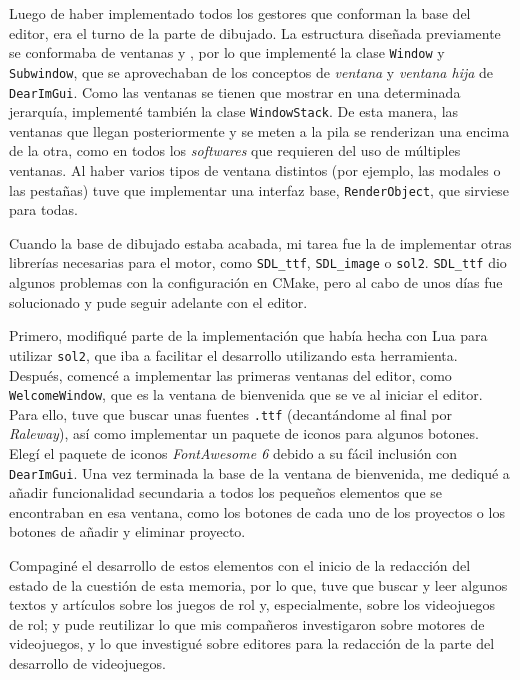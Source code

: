 \medskip

Luego de haber implementado todos los gestores que conforman la base del editor, era el turno de la parte de dibujado. La estructura diseñada previamente se conformaba de ventanas y , por lo que implementé la clase \texttt{Window} y \texttt{Subwindow}, que se aprovechaban de los conceptos de \textit{ventana} y \textit{ventana hija} de \texttt{DearImGui}. Como las ventanas se tienen que mostrar en una determinada jerarquía, implementé también la clase \texttt{WindowStack}. De esta manera, las ventanas que llegan posteriormente y se meten a la pila se renderizan una encima de la otra, como en todos los \textit{softwares} que requieren del uso de múltiples ventanas. Al haber varios tipos de ventana distintos (por ejemplo, las modales o las pestañas) tuve que implementar una interfaz base, \texttt{RenderObject}, que sirviese para todas.

\medskip

Cuando la base de dibujado estaba acabada, mi tarea fue la de implementar otras librerías necesarias para el motor, como \texttt{SDL\_ttf}, \texttt{SDL\_image} o \texttt{sol2}. \texttt{SDL\_ttf} dio algunos problemas con la configuración en CMake, pero al cabo de unos días fue solucionado y pude seguir adelante con el editor.

\smallskip

Primero, modifiqué parte de la implementación que había hecha con Lua para utilizar \texttt{sol2}, que iba a facilitar el desarrollo utilizando esta herramienta. Después, comencé a implementar las primeras ventanas del editor, como \texttt{WelcomeWindow}, que es la ventana de bienvenida que se ve al iniciar el editor. Para ello, tuve que buscar unas fuentes \texttt{.ttf} (decantándome al final por \textit{Raleway}), así como implementar un paquete de iconos para algunos botones. Elegí el paquete de iconos \textit{FontAwesome 6} debido a su fácil inclusión con \texttt{DearImGui}. Una vez terminada la base de la ventana de bienvenida, me dediqué a añadir funcionalidad secundaria a todos los pequeños elementos que se encontraban en esa ventana, como los botones de cada uno de los proyectos o los botones de añadir y eliminar proyecto.

\smallskip

Compaginé el desarrollo de estos elementos con el inicio de la redacción del estado de la cuestión de esta memoria, por lo que, tuve que buscar y leer algunos textos y artículos sobre los juegos de rol y, especialmente, sobre los videojuegos de rol; y pude reutilizar lo que mis compañeros investigaron sobre motores de videojuegos, y lo que investigué sobre editores para la redacción de la parte del desarrollo de videojuegos.

